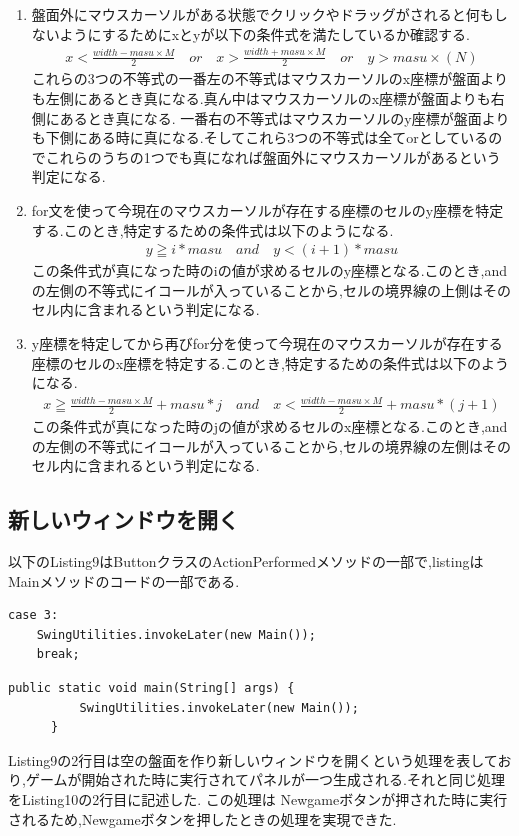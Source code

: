 \documentclass[dvipdfmx]{jarticle}
\begin{document}
\begin{enumerate}
  \item 盤面外にマウスカーソルがある状態でクリックやドラッグがされると何もしないようにするためにxとyが以下の条件式を満たしているか確認する.
  \begin{align}
      x < \frac{width-masu\times M}{2} \quad or \quad x> \frac{width+masu\times M}{2}\quad or \quad y > masu\times (N)
  \end{align}
  これらの3つの不等式の一番左の不等式はマウスカーソルのx座標が盤面よりも左側にあるとき真になる.真ん中はマウスカーソルのx座標が盤面よりも右側にあるとき真になる.
  一番右の不等式はマウスカーソルのy座標が盤面よりも下側にある時に真になる.そしてこれら3つの不等式は全てorとしているのでこれらのうちの1つでも真になれば盤面外にマウスカーソルがあるという判定になる.
  \item for文を使って今現在のマウスカーソルが存在する座標のセルのy座標を特定する.このとき,特定するための条件式は以下のようになる.
  \begin{align}
    y  \geqq  i*masu \quad and \quad y  < (i+1)*masu
  \end{align}
  この条件式が真になった時のiの値が求めるセルのy座標となる.このとき,andの左側の不等式にイコールが入っていることから,セルの境界線の上側はそのセル内に含まれるという判定になる.
  \item y座標を特定してから再びfor分を使って今現在のマウスカーソルが存在する座標のセルのx座標を特定する.このとき,特定するための条件式は以下のようになる.
  \begin{align}
    x \geqq \frac{width-masu \times M}{2}+masu*j \quad and \quad x< \frac{width-masu \times M}{2} + masu*(j+1)
  \end{align}
  この条件式が真になった時のjの値が求めるセルのx座標となる.このとき,andの左側の不等式にイコールが入っていることから,セルの境界線の左側はそのセル内に含まれるという判定になる.
\end{enumerate}

\subsection{新しいウィンドウを開く}
以下のListing9はButtonクラスのActionPerformedメソッドの一部で,listingはMainメソッドのコードの一部である.
\begin{lstlisting}[caption=Buttonクラスの一部,label=fuga]
    case 3:
    SwingUtilities.invokeLater(new Main());
    break;
\end{lstlisting}
\begin{lstlisting}[caption=Buttonクラスの一部,label=fuga]
    public static void main(String[] args) {
          SwingUtilities.invokeLater(new Main());
      }
\end{lstlisting}
Listing9の2行目は空の盤面を作り新しいウィンドウを開くという処理を表しており,ゲームが開始された時に実行されてパネルが一つ生成される.それと同じ処理をListing10の2行目に記述した.  この処理は
Newgameボタンが押された時に実行されるため,Newgameボタンを押したときの処理を実現できた.
\clearpage
\end{document}

